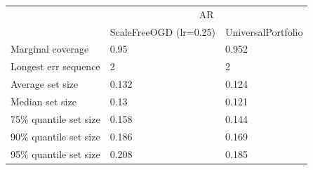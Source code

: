 \begin{tabular}{lll}
\toprule
& \multicolumn{2}{c}{AR} \\
& ScaleFreeOGD (lr=0.25) & UniversalPortfolio \\
\midrule
Marginal coverage & 0.95 & 0.952 \\
Longest err sequence & 2 & 2 \\
Average set size & 0.132 & 0.124 \\
Median set size & 0.13 & 0.121 \\
75\% quantile set size & 0.158 & 0.144 \\
90\% quantile set size & 0.186 & 0.169 \\
95\% quantile set size & 0.208 & 0.185 \\
\bottomrule
\end{tabular}
